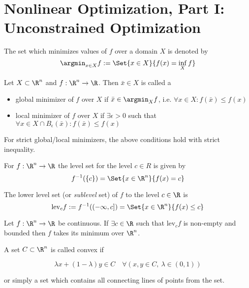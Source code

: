 \section{Nonlinear Optimization, Part I: Unconstrained Optimization}\label{fe5d4a2}

\def\pd{\succ} %
\def\psd{\succeq} %

\label{b27e478}

The set which minimizes values of $f$ over a domain $X$ is denoted by
$$
  \argmin_{x\in X}f:=\Set{x\in X}{f(x)=\inf_Xf}
$$

\label{bc7900e}

Let $X\subset\R^n$ and $f:\R^n\to\R$. Then $\bar x\in X$ is called a
\begin{itemize}
  \item global minimizer of $f$ over $X$ if $\bar x\in\argmin_Xf$, i.e. $\forall x\in
        X:f(\bar x)\leq f(x)$
  \item local minimizer of $f$ over $X$ if $\exists\epsilon>0$ such that $\forall x\in
        X\cap B_\epsilon(\bar x):f(\bar x)\leq f(x)$
\end{itemize}
For strict global/local minimizers, the above conditions hold with
strict inequality.

\label{d6589cc}

For $f:\R^n\to\R$ the level set for the level $c\in R$ is given by
$$
  f^{-1}(\{c\})=\Set{x\in\R^n}{f(x)=c}
$$

The lower level set (or \textit{sublevel} set) of $f$ to the level $c\in\R$ is
$$
  \text{lev}_cf:=f^{-1}((-\infty,c])=\Set{x\in\R^n}{f(x)\leq c}
$$

\label{bd1eec0}

Let $f:\R^n\to\R$ be continuous. If $\exists c\in\R$ such that $\text{lev}_cf$
is non-empty and bounded then $f$ takes its minimum over $\R^n$.

\label{e012971}

A set $C\subset\R^n$ is called convex if

$$
  \lambda x+(1-\lambda)y\in C\quad
  \forall(x,y\in C,\ \lambda\in(0,1))
$$

or simply a set which contains all connecting lines of points from the set.

\label{a114065}

